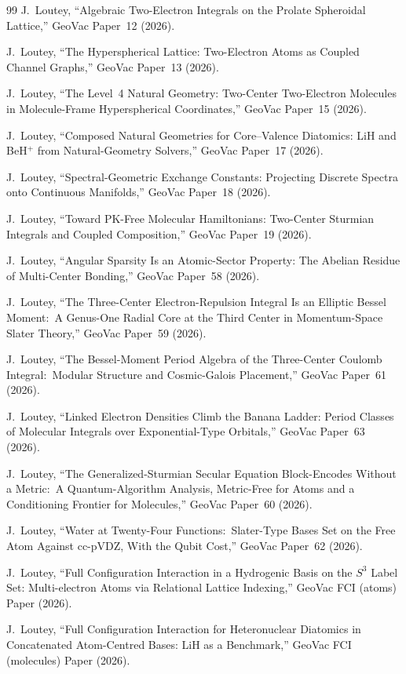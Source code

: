 \documentclass[aps,pra,twocolumn,superscriptaddress,longbibliography]{revtex4-2}
\begin{document}
\begin{thebibliography}{99}
J.~Loutey,
``Algebraic Two-Electron Integrals on the Prolate Spheroidal Lattice,''
GeoVac Paper~12 (2026).

J.~Loutey,
``The Hyperspherical Lattice: Two-Electron Atoms as Coupled Channel Graphs,''
GeoVac Paper~13 (2026).

J.~Loutey,
``The Level~4 Natural Geometry: Two-Center Two-Electron Molecules in Molecule-Frame Hyperspherical Coordinates,''
GeoVac Paper~15 (2026).

J.~Loutey,
``Composed Natural Geometries for Core--Valence Diatomics: LiH and BeH$^+$ from Natural-Geometry Solvers,''
GeoVac Paper~17 (2026).

J.~Loutey,
``Spectral-Geometric Exchange Constants: Projecting Discrete Spectra onto Continuous Manifolds,''
GeoVac Paper~18 (2026).

J.~Loutey,
``Toward PK-Free Molecular Hamiltonians: Two-Center Sturmian Integrals and Coupled Composition,''
GeoVac Paper~19 (2026).

J.~Loutey,
``Angular Sparsity Is an Atomic-Sector Property: The Abelian Residue of Multi-Center Bonding,''
GeoVac Paper~58 (2026).

J.~Loutey,
``The Three-Center Electron-Repulsion Integral Is an Elliptic Bessel Moment:\ A Genus-One Radial Core at the Third Center in Momentum-Space Slater Theory,''
GeoVac Paper~59 (2026).

J.~Loutey,
``The Bessel-Moment Period Algebra of the Three-Center Coulomb Integral:\ Modular Structure and Cosmic-Galois Placement,''
GeoVac Paper~61 (2026).

J.~Loutey,
``Linked Electron Densities Climb the Banana Ladder: Period Classes of Molecular Integrals over Exponential-Type Orbitals,''
GeoVac Paper~63 (2026).

J.~Loutey,
``The Generalized-Sturmian Secular Equation Block-Encodes Without a Metric:\ A Quantum-Algorithm Analysis, Metric-Free for Atoms and a Conditioning Frontier for Molecules,''
GeoVac Paper~60 (2026).

J.~Loutey,
``Water at Twenty-Four Functions:\ Slater-Type Bases Set on the Free Atom Against cc-pVDZ, With the Qubit Cost,''
GeoVac Paper~62 (2026).

J.~Loutey,
``Full Configuration Interaction in a Hydrogenic Basis on the $S^3$ Label Set: Multi-electron Atoms via Relational Lattice Indexing,''
GeoVac FCI (atoms) Paper (2026).

J.~Loutey,
``Full Configuration Interaction for Heteronuclear Diatomics in Concatenated Atom-Centred Bases: LiH as a Benchmark,''
GeoVac FCI (molecules) Paper (2026).

\end{thebibliography}
\end{document}
